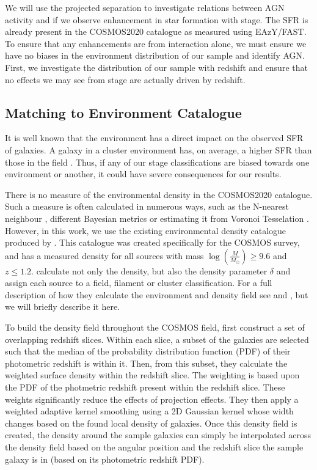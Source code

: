 We will use the projected separation to investigate relations between AGN activity and if we observe enhancement in star formation with stage. The SFR is already present in the COSMOS2020 catalogue as measured using EAzY/FAST. To ensure that any enhancements are from interaction alone, we must ensure we have no biases in the environment distribution of our sample and identify AGN. First, we investigate the distribution of our sample with redshift and ensure that no effects we may see from stage are actually driven by redshift.

\subsection{Matching to Environment Catalogue}\label{data:environ}
\noindent It is well known that the environment has a direct impact on the observed SFR of galaxies. A galaxy in a cluster environment has, on average, a higher SFR than those in the field \citep{2006MNRAS.373..469B}. Thus, if any of our stage classifications are biased towards one environment or another, it could have severe consequences for our results.

There is no measure of the environmental density in the COSMOS2020 catalogue. Such a measure is often calculated in numerous ways, such as the N-nearest neighbour \citep{2006MNRAS.373..469B}, different Bayesian metrics \citep{2008ApJ...674L..13C} or estimating it from Voronoi Tesselation \citep{2021inas.book...57V}. However, in this work, we use the existing environmental density catalogue produced by \citet{2017ApJ...837...16D}. This catalogue was created specifically for the COSMOS survey, and has a measured density for all sources with mass $\log(\frac{M}{M_\odot}) \geq 9.6$ and $z \leq 1.2$. \citet{2017ApJ...837...16D} calculate not only the density, but also the density parameter $\delta$ and assign each source to a field, filament or cluster classification. For a full description of how they calculate the environment and density field see \citet{2015ApJ...805..121D} and \citet{2017ApJ...837...16D}, but we will briefly describe it here.

To build the density field throughout the COSMOS field, \citet{2017ApJ...837...16D} first construct a set of overlapping redshift slices. Within each slice, a subset of the galaxies are selected such that the median of the probability distribution function (PDF) of their photometric redshift is within it. Then, from this subset, they calculate the weighted surface density within the redshift slice. The weighting is based upon the PDF of the photmetric redshift present within the redshift slice. These weights significantly reduce the effects of projection effects. They then apply a weighted adaptive kernel smoothing using a 2D Gaussian kernel whose width changes based on the found local density of galaxies. Once this density field is created, the density around the sample galaxies can simply be interpolated across the density field based on the angular position and the redshift slice the sample galaxy is in (based on its photometric redshift PDF).

